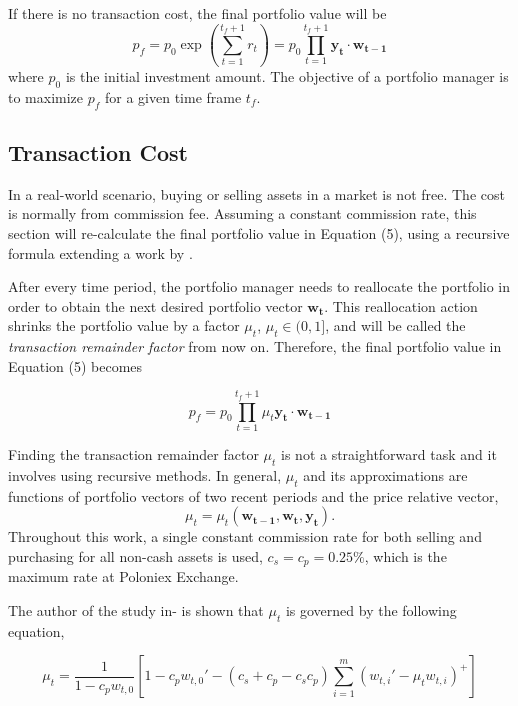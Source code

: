 \documentclass[journal,onecolumn]{IEEEtran}
\newcommand{\vc}[1]{\mathbf{#1}}
\begin{document}
If there is no transaction cost, the final portfolio value will be
\begin{equation}
p_f = p_0 \exp (\sum_{t=1}^{t_f+1} r_t) = p_0 \prod_{t=1}^{t_f+1} \vc{y_t}\cdot\vc{w_{t-1}}
\end{equation}
where $p_0$ is the initial investment amount. The objective of a portfolio manager is to maximize $p_f$ for a given time frame $t_f$.


\subsection{Transaction Cost}
In a real-world scenario, buying or selling assets in a market is not free. The cost is normally from commission fee. Assuming a constant commission rate, this section will re-calculate
the final portfolio value in Equation (5), using a recursive formula extending a work by \cite{Ormos2013}.

After every time period, the portfolio manager needs to reallocate the portfolio in order to obtain the next desired portfolio vector $\vc{w_t}$. This reallocation action shrinks the portfolio value by a factor $\mu_t$, $\mu_t \in(0, 1]$, and will be called the \textit{transaction remainder factor} from now on. Therefore, the final portfolio value in Equation (5) becomes





\begin{equation}
p_f = p_0 \prod_{t=1}^{t_f+1} \mu_t \vc{y_t}\cdot\vc{w_{t-1}}
\end{equation}

Finding the transaction remainder factor $\mu_t$ is not a straightforward task and it involves using recursive methods. In general, $\mu_t$ and its approximations are functions of portfolio vectors of two recent periods and the price relative vector,
\begin{equation}
	\mu_t = \mu_t(\vc{w_{t-1}}, \vc{w_{t}}, \vc{y_{t}}).
\end{equation}
Throughout this work, a single constant commission rate for both selling and purchasing for all non-cash assets is used, $c_s = c_p = 0.25\%$, which is the maximum rate at Poloniex Exchange.

The author of the study in-\cite{Jiang2017} is shown that $\mu_t$ is governed by the following equation,

\begin{equation}
	\mu_t = \frac{1}{1-c_pw_{t,0}}[1-c_p w_{t,0}' - (c_s+c_p-c_s c_p)\sum_{i=1}^{m}(w_{t,i}'-\mu_t w_{t,i})^+ ]
\end{equation}
\end{document}
